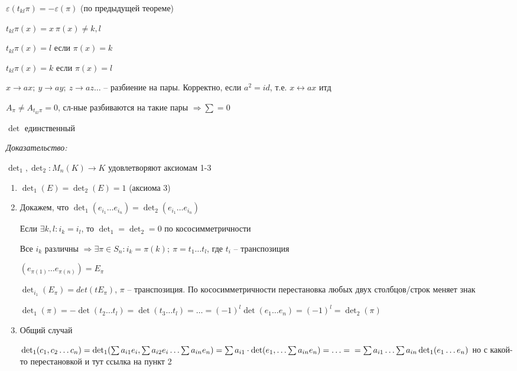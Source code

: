 \documentclass[12pt]{article}
\begin{document}
\begin{enumerate}
\begin{itemize}
        $\varepsilon(t_{kl}\pi) = - \varepsilon(\pi)$ (по предыдущей теореме)

        $t_{kl} \pi(x) = x\ \pi(x) \neq k, l$

        $t_{kl} \pi(x) = l$ если $\pi(x) = k$

        $t_{kl} \pi(x) = k$ если $\pi(x) = l$

        $x \to ax;\ y \to ay;\ z \to az \ldots$ -- разбиение на пары. Корректно, если $a^2 = id$, т.е. $x \leftrightarrow ax$ итд

        $A_\pi \neq A_{t_{kl} \pi} = 0$, сл-ные разбиваются на такие пары $\Rightarrow \sum = 0$
    \end{itemize}
\end{enumerate}

\begin{theo}{}
    $\det$ единственный 
\end{theo}

\textit{Доказательство:}

$\det_1, \det_2 : M_n(K) \to K$ удовлетворяют аксиомам 1-3

\begin{enumerate}
    \item $\det_1(E) = \det_2(E) = 1$ (аксиома 3)
    \item Докажем, что $\det_1(e_{i_1} \ldots e_{i_n}) = \det_2(e_{i_1} \ldots e_{i_n})$
    
    Если $\exists k, l : i_k = i_l$, то $\det_1 = \det_2 = 0$ по кососимметричности

    Все $i_k$ различны $\Rightarrow \exists \pi \in S_n : i_k = \pi(k);\ \pi = t_1 \ldots t_l$, где $t_i$ -- транспозиция

    $(e_{\pi(1)} \ldots e_{\pi(n)}) = E_\pi$

    $\det_{i_1}(E_\pi) = det(t E_\pi)$, $\pi$ -- транспозиция. По кососимметричности перестановка любых двух столбцов/строк меняет знак

    $\det_1(\pi) = -\det(t_2 \ldots t_l) = \det(t_3 \ldots t_l) = \ldots = (-1)^l\det(e_1 \ldots e_n) = (-1)^l = \det_2(\pi)$

    \item Общий случай
    
    $\det_1(c_1, c_2 \ldots c_n) = \det_1(\sum a_{i1}e_i, \sum a_{i2} e_i \ldots \sum a_{in}e_n) = \sum a_{i1} \cdot \det(e_1, \ldots \sum a_{in} e_n) = \ldots = \\ = \sum a_{i1} \ldots \sum a_{in} \det_1(e_1 \ldots e_n)$ но с какой-то перестановкой и тут ссылка на пункт 2
\end{enumerate}
\end{document}
